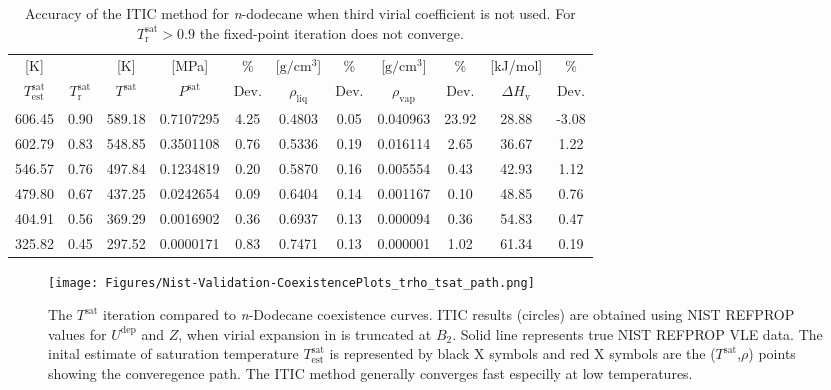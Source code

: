 \documentclass[%
 aip,
 jcp,
 sd,%
 amsmath,amssymb,
]{revtex4-1}
\begin{document}
\begin{table*}[]
\centering
\caption{Accuracy of the ITIC method for \textit{n}-dodecane when third virial coefficient is not used. For $T_\mathrm{r}^{\mathrm{sat}}>0.9$ the fixed-point iteration does not converge.}
\label{tab:NIST-VAL-C12-FTF}
\begin{tabular}{ccccccccccc}
\hline
{[}K{]}&  & {[}K{]} &	 {[}MPa{]} &	 \% 	& {[}$\mathrm{g/cm^3}${]} & \% & {[}$\mathrm{g/cm^3}${]} & \% 	& {[}kJ/mol{]} & \% \\
$T_\mathrm{est}^{\mathrm{sat}}$ & $T_\mathrm{r}^{\mathrm{sat}}$ & $T^{\mathrm{sat}}$ & $P^{\mathrm{sat}}$ & Dev. & $\rho_{\mathrm{liq}}$ &	 Dev. & $\rho_{\mathrm{vap}}$ & Dev. & $\Delta H_{\mathrm{v}}$ & Dev. \\
\hline
606.45 & 0.90 & 589.18 & 0.7107295 & 4.25 & 0.4803 & 0.05 & 0.040963 & 23.92 & 28.88 & -3.08 \\
602.79 & 0.83 & 548.85 & 0.3501108 & 0.76 & 0.5336 & 0.19 & 0.016114 & 2.65  & 36.67 & 1.22  \\
546.57 & 0.76 & 497.84 & 0.1234819 & 0.20 & 0.5870 & 0.16 & 0.005554 & 0.43  & 42.93 & 1.12  \\
479.80 & 0.67 & 437.25 & 0.0242654 & 0.09 & 0.6404 & 0.14 & 0.001167 & 0.10  & 48.85 & 0.76  \\
404.91 & 0.56 & 369.29 & 0.0016902 & 0.36 & 0.6937 & 0.13 & 0.000094 & 0.36  & 54.83 & 0.47  \\
325.82 & 0.45 & 297.52 & 0.0000171 & 0.83 & 0.7471 & 0.13 & 0.000001 & 1.02  & 61.34 & 0.19  \\
\hline
\end{tabular}

\end{table*}

\begin{figure*}
\centering
\texttt{[image: Figures/Nist-Validation-CoexistencePlots\_trho\_tsat\_path.png]}
\caption{ 
The $T^\mathrm{sat}$ iteration compared to \textit{n}-Dodecane coexistence curves. ITIC results (circles) are obtained using NIST REFPROP \cite{Lemmon2004} values for $U^{\mathrm{dep}}$ and $Z$, when virial expansion in is truncated at $B_2$. Solid line represents true NIST REFPROP VLE data. The inital estimate of saturation temperature $T^\mathrm{sat}_\mathrm{est}$ is represented by black X symbols and red X symbols are the ($T^\mathrm{sat}$,$\rho$) points showing the converegence path. The ITIC method generally converges fast especilly at low temperatures.
}
\label{fig:tsat_path}
\end{figure*}
\end{document}

